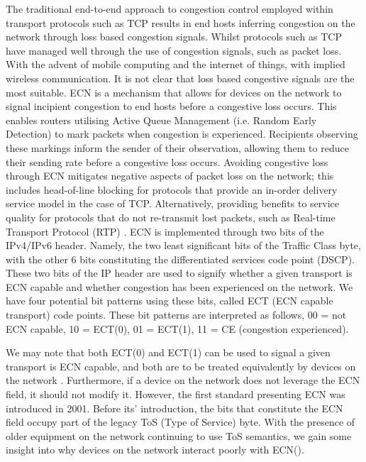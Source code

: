 \documentclass{l4proj}
\begin{document}
The traditional end-to-end approach to congestion control employed within transport protocols such as TCP results in end hosts inferring congestion on the network through loss based congestion signals. Whilst protocols such as TCP have managed well through the use of congestion signals, such as packet loss. With the advent of mobile computing and the internet of things, with implied wireless communication. It is not clear that loss based congestive signals are the most suitable.
ECN is a mechanism that allows for devices on the network to signal incipient congestion to end hosts before a congestive loss occurs\citep{rfc3168}. This enables routers utilising Active Queue Management (i.e. Random Early Detection) to mark packets when congestion is experienced. Recipients observing these markings inform the sender of their observation, allowing them to reduce their sending rate before a congestive loss occurs. Avoiding congestive loss through ECN mitigates negative aspects of packet loss on the network; this includes head-of-line blocking for protocols that provide an in-order delivery service model in the case of TCP. Alternatively, providing benefits to service quality for protocols that do not re-transmit lost packets, such as Real-time Transport Protocol (RTP) \citep{rfc6679}.
ECN is implemented through two bits of the IPv4/IPv6 header. Namely, the two least significant bits of the Traffic Class byte, with the other 6 bits constituting the differentiated services code point (DSCP). These two bits of the IP header are used to signify whether a given transport is ECN capable and whether congestion has been experienced on the network. We have four potential bit patterns using these bits, called ECT (ECN capable transport) code points. These bit patterns are interpreted as follows, 00 = not ECN capable, 10 = ECT(0), 01 = ECT(1), 11 = CE (congestion experienced).

We may note that both ECT(0) and ECT(1) can be used to signal a given transport is ECN capable, and both are to be treated equivalently by devices on the network \citep{rfc3168}. Furthermore, if a device on the network does not leverage the ECN field, it should not modify it. However, the first standard presenting ECN was introduced in 2001. Before its' introduction, the bits that constitute the ECN field occupy part of the legacy ToS (Type of Service) byte. With the presence of older equipment on the network continuing to use ToS semantics, we gain some insight into why devices on the network interact poorly with ECN(\cite{kuhlewind_state_2013}).
\end{document}
